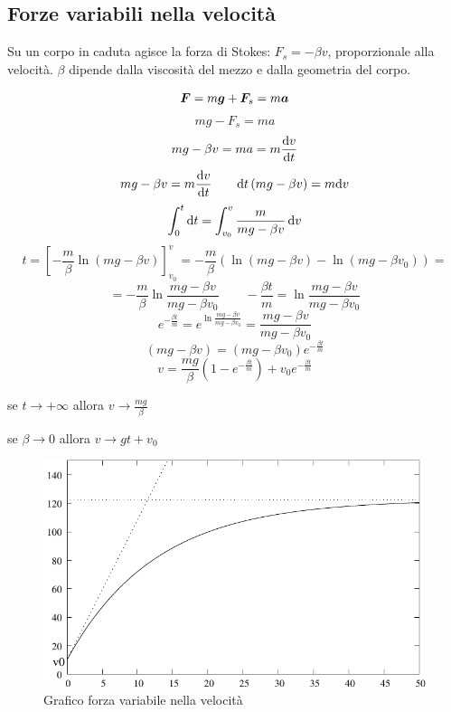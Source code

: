 \subsection{Forze variabili nella velocità}
Su un corpo in caduta agisce la forza di Stokes: $F_s=-\beta v$,
proporzionale alla velocità. $\beta$ dipende dalla viscosità del
mezzo e dalla geometria del corpo.

\begin{equation*}\boldsymbol{F}=m\boldsymbol{g}+\boldsymbol{F}_s=m\boldsymbol{a}\end{equation*}
\begin{equation*}mg-F_s=ma\end{equation*}
\begin{equation*}mg-\beta v=ma=m\frac{\mathrm{d} v}{\mathrm{d} t}\end{equation*}
\begin{equation*}mg-\beta v=m\frac{\mathrm{d} v}{\mathrm{d} t}\qquad \mathrm{d} t\left(mg-\beta v\right)=m\mathrm{d} v\end{equation*}
\begin{equation*}\int_0^t\mathrm{d} t=\int_{v_0}^v\frac{m}{mg-\beta v}\,\mathrm{d} v\end{equation*}
\[t=\left[-\frac{m}{\beta}\ln\left(mg-\beta
v\right)\right]_{v_0}^{v}=-\frac{m}{\beta}\left(\ln\left(mg-\beta
v\right)-\ln\left(mg-\beta v_0\right)\right)=\]
\begin{equation*}=-\frac{m}{\beta}\ln\frac{mg-\beta v}{mg-\beta v_0}\qquad-\frac{\beta t}{m}=\ln\frac{mg-\beta v}{mg-\beta v_0}\end{equation*}
\begin{equation*}e^{-\frac{\beta t}{m}}=e^{\ln\frac{mg-\beta v}{mg-\beta v_0}}=\frac{mg-\beta v}{mg-\beta v_0}\end{equation*}
\begin{equation*}(mg-\beta v)=(mg-\beta v_0)e^{-\frac{\beta t}{m}}\end{equation*}
\[v=\frac{mg}{\beta}\left(1-e^{-\frac{\beta
t}{m}}\right)+v_0e^{-\frac{\beta t}{m}}\]

se $t\rightarrow +\infty$ allora $v\rightarrow\frac{mg}{\beta}$

se $\beta\rightarrow 0$ allora $v\rightarrow gt+v_0$
\begin{figure}[htbp]
\centering
\includegraphics[scale=1]{immagini/fisica1/grafico_forze_nella_velocita}
\caption{Grafico forza variabile nella velocità}
\end{figure}


